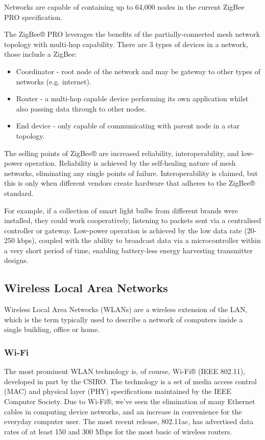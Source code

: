 Networks are capable of containing up to 64,000 nodes in the current ZigBee PRO specification.

The ZigBee® PRO leverages the benefits of the partially-connected mesh network topology with multi-hop capability. There are 3 types of devices in a network, those include a ZigBee:

\begin{itemize}
    \item Coordinator - root node of the network and may be gateway to other types of networks (e.g. internet).
    \item Router - a multi-hop capable device performing its own application whilst also passing data through to other nodes.
    \item  End device - only capable of communicating with parent node in a star topology.
\end{itemize}

The selling points of ZigBee® are increased reliability, interoperability, and low-power operation. Reliability is achieved by the self-healing nature of mesh networks, eliminating any single points of failure. Interoperability is claimed, but this is only when different vendors create hardware that adheres to the ZigBee® standard.

For example, if a collection of smart light bulbs from different brands were installed, they could work cooperatively, listening to packets sent via a centralised controller or gateway. Low-power operation is achieved by the low data rate (20-250 kbps), coupled with the ability to broadcast data via a microcontroller within a very short period of time, enabling battery-less energy harvesting transmitter designs.

\subsection{Wireless Local Area Networks}

Wireless Local Area Networks (WLANs) are a wireless extension of the LAN, which is the term typically used to describe a network of computers inside a single building, office or home.

\subsubsection{Wi-Fi}

The most prominent WLAN technology is, of course, Wi-Fi® (IEEE 802.11), developed in part by the CSIRO. The technology is a set of media access control (MAC) and physical layer (PHY) specifications maintained by the IEEE Computer Society. Due to Wi-Fi®, we’ve seen the elimination of many Ethernet cables in computing device networks, and an increase in convenience for the everyday computer user. The most recent release, 802.11ac, has advertised data rates of at least 150 and 300 Mbps for the most basic of wireless routers.

